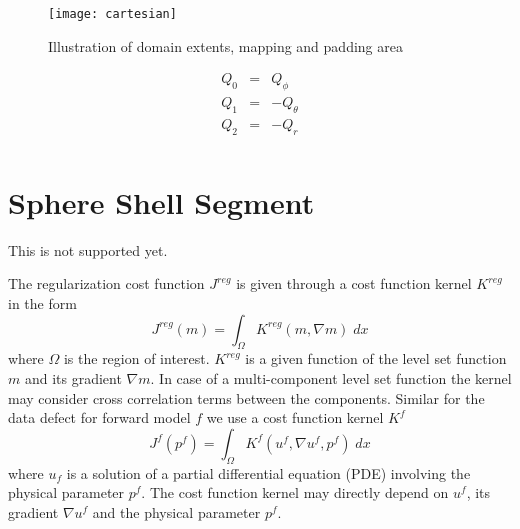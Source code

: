 \begin{figure}[ht]
    \centering\texttt{[image: cartesian]}
    \caption{Illustration of domain extents, mapping and padding area}
    \label{fig:cartesianDomain}
\end{figure}

\begin{equation}\label{REF:EQU:INTRO 9}
\begin{array}{rcl}
Q_0  & = &  Q_{\phi} \\
Q_1  & = & -Q_{\theta} \\
Q_2  & = & -Q_r \\
\end{array}
\end{equation}

\section{Sphere Shell Segment}
This is not supported yet.

The regularization cost function $J^{reg}$ is given through a cost function
kernel $K^{reg}$ in the form
\begin{equation}\label{REF:EQU:INTRO 2a}
J^{reg}(m) = \int_{\Omega} K^{reg}(m, \nabla m) \; dx
\end{equation} 
where $\Omega$ is the region of interest. $K^{reg}$ is a given function of the
level set function $m$ and its gradient $\nabla m$.
In case of a multi-component level set function the kernel may consider cross
correlation terms between the components.
Similar for the data defect for forward model $f$ we use a cost function kernel $K^{f}$ 
\begin{equation}\label{REF:EQU:INTRO 2b}
J^{f}(p^f) = \int_{\Omega} K^{f}(u^f, \nabla u^f,p^f) \; dx
\end{equation} 
where $u_f$ is a solution of a partial differential equation (PDE) involving
the physical parameter $p^f$.
The cost function kernel may directly depend on $u^f$, its gradient
$\nabla u^f$ and the physical parameter $p^f$.





 
